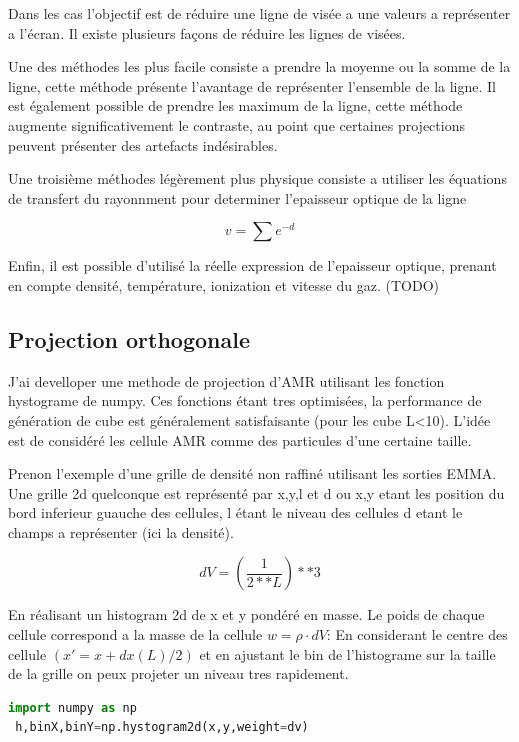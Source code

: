 Dans les cas l'objectif est de réduire une ligne de visée a une valeurs a représenter a l’écran.
Il existe plusieurs façons de réduire les lignes de visées.

Une des méthodes les plus facile consiste a prendre la moyenne ou la somme de la ligne, cette méthode présente l'avantage de représenter l'ensemble de la ligne.
Il est également possible de prendre les maximum de la ligne, cette méthode augmente significativement le contraste, au point que certaines projections peuvent présenter des artefacts indésirables.

Une troisième méthodes légèrement plus physique consiste a utiliser les équations de transfert du rayonnment pour determiner l'epaisseur optique de la ligne

\begin{equation}
v= \sum e^{-d}
\end{equation}

Enfin, il est possible d'utilisé la réelle expression de l'epaisseur optique, prenant en compte densité, température, ionization et vitesse du gaz.
(TODO)


\subsection{Projection orthogonale}
J'ai develloper une methode de projection d'AMR utilisant les fonction hystograme de numpy.
Ces fonctions étant tres optimisées, la performance de génération de cube est généralement satisfaisante (pour les cube L<10).
L'idée est de considéré les cellule AMR comme des particules d'une certaine taille.

Prenon l'exemple d'une grille de densité non raffiné utilisant les sorties EMMA.
Une grille 2d  quelconque est représenté par x,y,l et d ou x,y etant les position du bord inferieur guauche des cellules, l étant le niveau des cellules d etant le champs a représenter (ici la densité).

\begin{equation}
dV= \left( \frac{1}{2**L }\right) **3
\end{equation} 

En réalisant un histogram 2d de x et y pondéré en masse.
Le poids de chaque cellule correspond a la masse de la cellule $w = \rho \cdot dV$:
En considerant le centre des cellule $(x' = x+dx(L) /2)$ et en ajustant le bin de l'histograme sur la taille de la grille on peux projeter un niveau tres rapidement.

\begin{lstlisting}[float=bth,language=python,frame=tb,caption={lprojection de l'AMR par la méthode des histogramme Numpy},label=lst:useless]
 import numpy as np
 h,binX,binY=np.hystogram2d(x,y,weight=dv)
\end{lstlisting}

